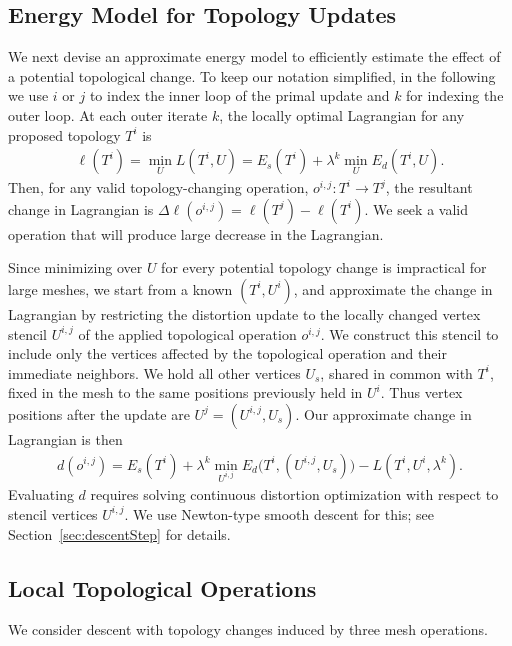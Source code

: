 \subsection{Energy Model for Topology Updates}
\label{sec:topology_energy}
We next devise an approximate energy model to efficiently estimate the effect of a potential topological change. 
To keep our notation simplified, in the following we use $i$ or $j$ to index the inner loop of the primal update and $k$ for indexing the outer loop.
At each outer iterate $k$, the locally optimal Lagrangian for any proposed topology $T^i$ is  
\begin{align}
\ell(T^i) = \min_{U} L(T^i, U) = E_s(T^i) + \lambda^k \min_{U} E_d(T^i, U).
\end{align}
Then, for any valid topology-changing operation, $o^{i,j}:T^i \rightarrow T^j$, the resultant change in Lagrangian is $\Delta \ell(o^{i,j}) = \ell(T^j) - \ell(T^i)$. We seek a valid operation that will produce large decrease in the Lagrangian.


Since minimizing over $U$ for every potential topology change is 
impractical
for large meshes, we start from a known $(T^i, U^i)$, and approximate the change in Lagrangian by restricting the distortion update to the locally changed vertex stencil $U^{i,j}$ of the applied topological operation $o^{i,j}$. We construct this stencil to include only the vertices affected by the topological operation and their immediate neighbors.
We hold all other vertices $U_s$, shared in common with $T^i$, fixed in the mesh
to the same positions previously held in $U^i$. Thus vertex positions after the update are $U^j = (U^{i,j}, U_s)$.  Our approximate change in Lagrangian is then 
\begin{align} 
d(o^{i,j}) = E_s(T^i) + \lambda^k \min_{U^{i,j}} E_d \big( T^i, (U^{i,j}, U_s) \big) - L(T^i,U^i,\lambda^k).
\end{align}
%
Evaluating $d$ requires solving continuous distortion optimization with respect to stencil vertices $U^{i,j}$. We use Newton-type smooth descent for this; see Section~\ref{sec:descentStep} for details.

\subsection{Local Topological Operations}
\label{sec:topology_ops}

We consider descent with topology changes induced by three mesh operations.

